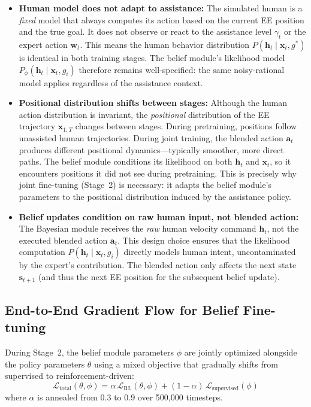 \documentclass[11pt]{article}
\newcommand{\hvec}{\mathbf{h}_t}
\newcommand{\wvec}{\mathbf{w}_t}
\newcommand{\avec}{\mathbf{a}_t}
\begin{document}
\begin{itemize}
    \item \textbf{Human model does not adapt to assistance:}
    The simulated human is a \emph{fixed} model that always computes its action based on the current EE position and the true goal.
    It does not observe or react to the assistance level $\gamma_t$ or the expert action $\wvec$.
    This means the human behavior distribution $P(\hvec \mid \mathbf{x}_t, g^*)$ is identical in both training stages.
    The belief module's likelihood model $P_\phi(\hvec \mid \mathbf{x}_t, g_i)$ therefore remains well-specified: the same noisy-rational model applies regardless of the assistance context.

    \item \textbf{Positional distribution shifts between stages:}
    Although the human action distribution is invariant, the \emph{positional} distribution of the EE trajectory $\mathbf{x}_{1:T}$ changes between stages.
    During pretraining, positions follow unassisted human trajectories.
    During joint training, the blended action $\avec$ produces different positional dynamics---typically smoother, more direct paths.
    The belief module conditions its likelihood on both $\hvec$ and $\mathbf{x}_t$, so it encounters positions it did not see during pretraining.
    This is precisely why joint fine-tuning (Stage~2) is necessary: it adapts the belief module's parameters to the positional distribution induced by the assistance policy.

    \item \textbf{Belief updates condition on raw human input, not blended action:}
    The Bayesian module receives the \emph{raw} human velocity command $\hvec$, not the executed blended action $\avec$.
    This design choice ensures that the likelihood computation $P(\hvec \mid \mathbf{x}_t, g_i)$ directly models human intent, uncontaminated by the expert's contribution.
    The blended action only affects the next state $\mathbf{s}_{t+1}$ (and thus the next EE position for the subsequent belief update).
\end{itemize}


\subsection{End-to-End Gradient Flow for Belief Fine-tuning}

During Stage~2, the belief module parameters $\phi$ are jointly optimized alongside the policy parameters $\theta$ using a mixed objective that gradually shifts from supervised to reinforcement-driven:
\begin{equation}
    \mathcal{L}_{\text{total}}(\theta, \phi) = \alpha\, \mathcal{L}_{\text{RL}}(\theta, \phi) + (1 - \alpha)\, \mathcal{L}_{\text{supervised}}(\phi)
    \label{eq:mixed-obj}
\end{equation}
where $\alpha$ is annealed from 0.3 to 0.9 over 500{,}000 timesteps.
\end{document}

